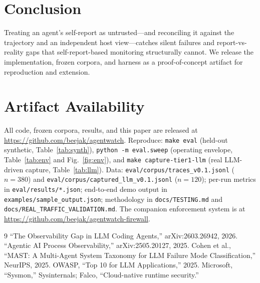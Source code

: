 \documentclass[conference]{IEEEtran}
\begin{document}
\section{Conclusion}
Treating an agent's self-report as untrusted---and reconciling it against the trajectory and an
independent host view---catches silent failures and report-vs-reality gaps that
self-report-based monitoring structurally cannot. We release the implementation, frozen
corpora, and harness as a proof-of-concept artifact for reproduction and extension.

\section*{Artifact Availability}
All code, frozen corpora, results, and this paper are released at
\url{https://github.com/beejak/agentwatch}. Reproduce: \texttt{make eval} (held-out synthetic,
Table~\ref{tab:synth}), \texttt{python -m eval.sweep} (operating envelope, Table~\ref{tab:env}
and Fig.~\ref{fig:env}), and \texttt{make capture-tier1-llm} (real LLM-driven capture,
Table~\ref{tab:llm}). Data: \texttt{eval/corpus/traces\_v0.1.jsonl} ($n{=}380$) and
\texttt{eval/corpus/captured\_llm\_v0.1.jsonl} ($n{=}120$); per-run metrics in
\texttt{eval/results/*.json}; end-to-end demo output in \texttt{examples/sample\_output.json};
methodology in \texttt{docs/TESTING.md} and \texttt{docs/REAL\_TRAFFIC\_VALIDATION.md}. The
companion enforcement system is at \url{https://github.com/beejak/agentwatch-firewall}.

\begin{thebibliography}{9}
 ``The Observability Gap in LLM Coding Agents,'' arXiv:2603.26942, 2026.
 ``Agentic AI Process Observability,'' arXiv:2505.20127, 2025.
 Cohen et al., ``MAST: A Multi-Agent System Taxonomy for LLM Failure Mode
Classification,'' NeurIPS, 2025.
 OWASP, ``Top 10 for LLM Applications,'' 2025.
 Microsoft, ``Sysmon,'' Sysinternals; Falco, ``Cloud-native runtime security.''
\end{thebibliography}

\balance
\end{document}

